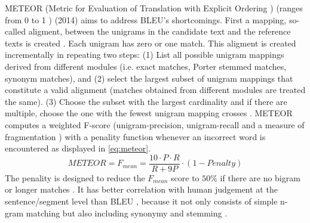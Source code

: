 METEOR (Metric for Evaluation of Translation with Explicit Ordering \citep{palivela_optimization_2021,banerjee_METEOR_2005}) 
(ranges from 0 to 1 \citep{kurt_pehlivanoglu_comparative_2024}) (2014) aims to address BLEU's shortcomings.
First a mapping, so-called aligment, between the unigrams in the candidate text and the reference texts is created \citep{banerjee_METEOR_2005}.
Each unigram has zero or one match.
This aligment is created incrementally in repeating two steps:
(1) List all possible unigram mappings derived from different modules (i.e. exact matches, Porter stemmed matches, synonym matches), 
and (2) select the largest subset of unigram mappings that constitute a valid alignment (matches obtained from different modules are treated the same).
(3) Choose the subset with the largest cardinality and if there are multiple, choose the one with the fewest unigram mapping crosses \citep{banerjee_METEOR_2005}.
METEOR computes a weighted F-score 
(unigram-precision, unigram-recall \citep{kurt_pehlivanoglu_comparative_2024,banerjee_METEOR_2005} 
and a measure of fragmentation \citep{banerjee_METEOR_2005,kurt_pehlivanoglu_comparative_2024})
with a penality function whenever an incorrect word is encountered \citep{palivela_optimization_2021} as displayed in \autoref{eq:meteor}.
\begin{equation}
    METEOR = F_{mean} = \frac{10 \cdot P \cdot R}{R + 9P} \cdot (1 - Penalty)
\label{eq:meteor}
\end{equation}
The penality is designed to reduce the $F_{mean}$ score to $50\%$ if there are no bigram or longer matches \citep{banerjee_METEOR_2005}.
It has better correlation with human judgement at the sentence/segment level than BLEU \citep{zhou_paraphrase_2021}, 
because it not only consists of simple n-gram matching but also including synonymy and stemming \citep{kurt_pehlivanoglu_comparative_2024}.

